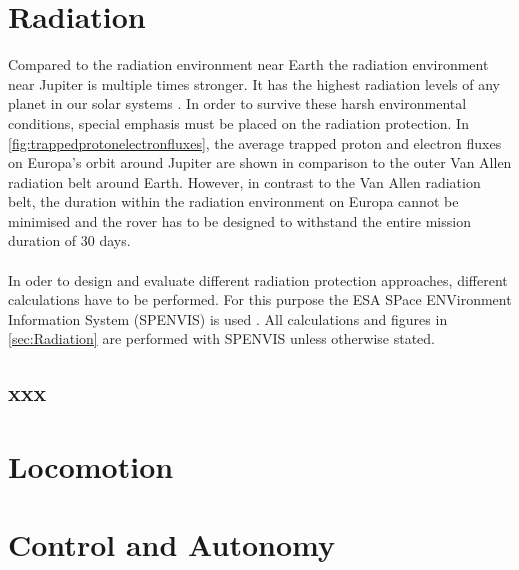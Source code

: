 \clearpage

\section{Radiation}
\label{sec:Radiation}

Compared to the radiation environment near Earth the radiation environment near Jupiter is multiple times stronger. It has the highest radiation levels of any planet in our solar systems \cite{Platzhalter}. In order to survive these harsh environmental conditions, special emphasis must be placed on the radiation protection. In \autoref{fig:trappedprotonelectronfluxes}, the average trapped proton and electron fluxes on Europa's orbit around Jupiter are shown in comparison to the outer Van Allen radiation belt around Earth. However, in contrast to the Van Allen radiation belt, the duration within the radiation environment on Europa cannot be minimised and the rover has to be designed to withstand the entire mission duration of 30 days. \\ \\
In oder to design and evaluate different radiation protection approaches, different calculations have to be performed. For this purpose the ESA SPace ENVironment Information System (SPENVIS) is used \cite{Platzhalter}. All calculations and figures in \autoref{sec:Radiation} are performed with SPENVIS unless otherwise stated.

\subsection{xxx}

\clearpage

\section{Locomotion}
\label{sec:locomotion}



\section{Control and Autonomy}
\label{sec:ControlandAutonomy}

\cleardoublepage